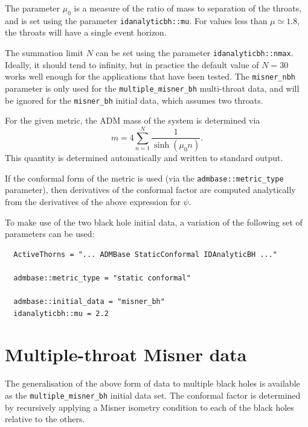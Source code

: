 \documentclass{article}
\begin{document}
The parameter $\mu_0$ is a measure of the ratio of mass to separation
of the throats, and is set using the parameter
\texttt{idanalyticbh::mu}. For values less than $\mu\simeq 1.8$, the
throats will have a single event horizon.

The summation limit $N$ can be set using the parameter
\texttt{idanalyticbh::nmax}. Ideally, it should tend to infinity, but
in practice the default value of $N=30$ works well enough for the
applications that have been tested. The \texttt{misner\_nbh} parameter
is only used for the \texttt{multiple\_misner\_bh} multi-throat data,
and will be ignored for the \texttt{misner\_bh} initial data, which
assumes two throats.

For the given metric, the ADM mass of the system is determined via
\begin{equation}
  m = 4 \sum^N_{n=1} \frac{1}{\sinh(\mu_0 n)}.
\end{equation}
This quantity is determined automatically and written to standard
output.

If the conformal form of the metric is used (via the
\texttt{admbase::metric\_type} parameter), then derivatives of the
conformal factor are computed analytically from the derivatives of the
above expression for $\psi$.

To make use of the two black hole initial data, a variation of the
following set of parameters can be used:
\begin{verbatim}
  ActiveThorns = "... ADMBase StaticConformal IDAnalyticBH ..."

  admbase::metric_type = "static conformal"

  admbase::initial_data = "misner_bh"
  idanalyticbh::mu = 2.2
\end{verbatim}


\section{Multiple-throat Misner data}

The generalisation of the above form of data to multiple black holes
is available as the \texttt{multiple\_misner\_bh} initial data set. The
conformal factor is determined by recursively applying a Misner
isometry condition to each of the black holes relative to the others.
\end{document}
